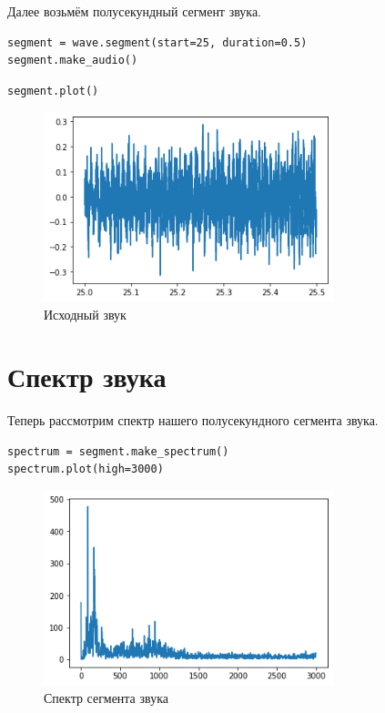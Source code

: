 \documentclass[a4paper,12pt]{report}
\begin{document}
Далее возьмём полусекундный сегмент звука.

\begin{lstlisting}[caption=Изменение и прослушивание звука]
segment = wave.segment(start=25, duration=0.5)
segment.make_audio()
\end{lstlisting}

\begin{lstlisting}[caption=Визуализация укороченного звука]
segment.plot()
\end{lstlisting}

\begin{figure}[H]
        \centering
        \includegraphics[width=0.75\textwidth]{lab1_fig2_2.png}
        \caption{Исходный звук}
        \label{fig:lab1_fig2_2}
\end{figure}

\section{Спектр звука}

Теперь рассмотрим спектр нашего полусекундного сегмента звука.

\begin{lstlisting}[caption=Спектр сегмента звука]
spectrum = segment.make_spectrum()
spectrum.plot(high=3000)
\end{lstlisting}

\begin{figure}[H]
        \centering
        \includegraphics[width=0.75\textwidth]{lab1_fig2_3.png}
        \caption{Спектр сегмента звука}
        \label{fig:lab1_fig2_3}
\end{figure}
\end{document}

